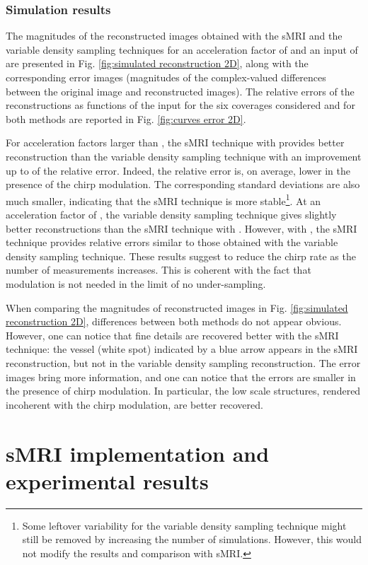 \documentclass[10pt,draftcls, onecolumn]{IEEEtran}
\begin{document}
\subsubsection{Simulation results}

The magnitudes of the reconstructed images obtained with the sMRI and the variable density sampling techniques for an acceleration factor of  and an input  of  are presented in Fig. \ref{fig:simulated reconstruction 2D}, along with the corresponding error images (magnitudes of the complex-valued differences between the original image and reconstructed images). The relative errors of the reconstructions as functions of the input  for the six coverages considered and for both methods are reported in Fig. \ref{fig:curves error 2D}. 

For acceleration factors larger than , the sMRI technique with  provides better reconstruction than the variable density sampling technique with an improvement up to  of the relative error. Indeed, the relative error is, on average, lower in the presence of the chirp modulation. The corresponding standard deviations are also much smaller, indicating that the sMRI technique is more stable\footnote{Some leftover variability for the variable density sampling technique might still be removed by increasing the number of simulations. However, this would not modify the results and comparison with sMRI.}. At an acceleration factor of , the variable density sampling technique gives slightly better reconstructions than the sMRI technique with . However, with , the sMRI technique provides relative errors similar to those obtained with the variable density sampling technique. These results suggest to reduce the chirp rate as the number of measurements increases. This is coherent with the fact that modulation is not needed in the limit of no under-sampling.

When comparing the magnitudes of reconstructed images in Fig. \ref{fig:simulated reconstruction 2D}, differences between both methods do not appear obvious. However, one can notice that fine details are recovered better with the sMRI technique: the vessel (white spot) indicated by a blue arrow appears in the sMRI reconstruction, but not in the variable density sampling reconstruction. The error images bring more information, and one can notice that the errors are smaller in the presence of chirp modulation. In particular, the low scale structures, rendered incoherent with the chirp modulation, are better recovered.

\section{sMRI implementation and experimental results}
\label{sec:Real acquisitions}
\end{document}

